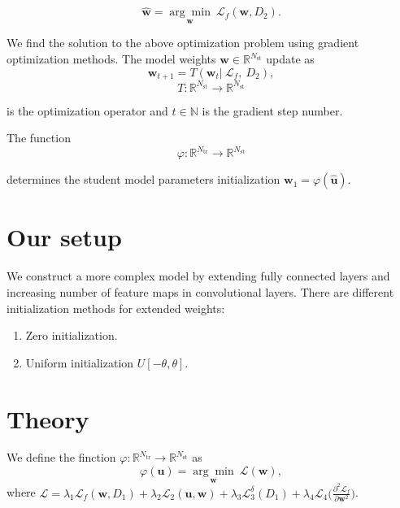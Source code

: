 \documentclass[80pt]{article}
\begin{document}
$$\hat{\mathbf{w}} =  \underset{\mathbf{w}}{\arg\min}~\mathcal{L}_f(\mathbf{w}, D_2).$$

We find the solution to the above optimization problem using gradient optimization methods. The model weights $\mathbf{w} \in \mathbb{R}^{N_{\text{st}}}$ update as
\[\mathbf{w}_{t+1} = T(\mathbf{w}_t |~\mathcal{L}_f,~D_2),\]
\[T: \mathbb{R}^{N_\text{st}} \rightarrow \mathbb{R}^{N_\text{st}}\]

is the optimization operator and $t \in \mathbb{N}$ is the gradient step number.

The function 
\[\varphi: \mathbb{R}^{N_\text{tr}} \rightarrow \mathbb{R}^{N_\text{st}}\]

determines the student model parameters initialization $\mathbf{w}_1 = \varphi(\hat{\mathbf{u}})$.

\section{Our setup}
\label{sec:setup}

We construct a more complex model by extending fully connected layers and increasing number of feature maps in convolutional layers. There are different initialization methods for extended weights:

\begin{enumerate}
    \item Zero initialization.
    \item Uniform initialization $U[-\theta, \theta]$.
\end{enumerate}

\section{Theory}

We define the finction $\varphi: \mathbb{R}^{N_\text{tr}} \rightarrow \mathbb{R}^{N_\text{st}}$ as
$$\varphi(\mathbf{u}) = \underset{\mathbf{w}}{\arg\min}~\mathcal{L}(\mathbf{w}),$$
where $\mathcal{L} = \lambda_1 \mathcal{L}_f(\mathbf{w}, D_1) + \lambda_2 \mathcal{L}_2 (\mathbf{u}, \mathbf{w}) + \lambda_3 \mathcal{L}_3^\delta (D_1) + \lambda_4 \mathcal{L}_4 \bigl(\displaystyle \frac{\partial^2 \mathcal{L}_f}{\partial \mathbf{w}^2}\bigr)$.
\end{document}
